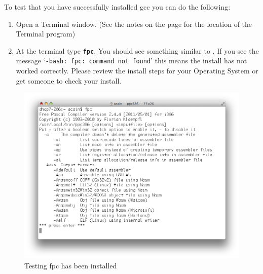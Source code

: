 To test that you have successfully installed gcc you can do the following:
\begin{enumerate}
  \item Open a Terminal window. (See the notes on the  page for the location of the Terminal program)
  \item At the terminal type \textbf{\texttt{fpc}}. You should see something similar to . If you see the message `\texttt{-bash: fpc: command not found}' this means the install has not worked correctly. Please review the install steps for your Operating System or get someone to check your install.
\end{enumerate}

\begin{figure}[h]
   \centering
   \includegraphics[width=\textwidth]{./topics/programs-and-compilers/images/fpcInstall} 
   \caption{Testing fpc has been installed}
   \label{fig:fpc-install}
\end{figure}


